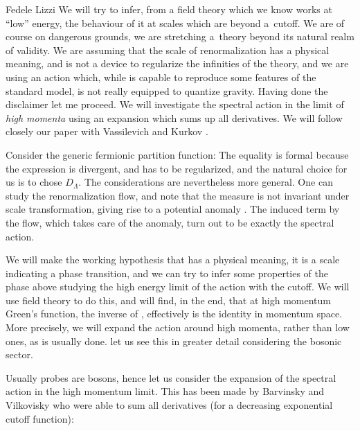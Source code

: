 \begin{artengenv}{Fedele Lizzi}
We will try to infer, from a field theory which we know works at ``low'' energy, the behaviour of it at scales which are beyond a~cutoff. We are of course on dangerous grounds, we are stretching a~theory beyond its natural realm of validity. We are assuming that the scale of renormalization has a physical meaning, and is not a device to regularize the infinities of the theory, and we are using an action which, while is capable to reproduce some features of the standard model, is not really equipped to quantize gravity.
Having done the disclaimer let me proceed. We will investigate the spectral action in the limit of \emph{high momenta} using an expansion which sums up all derivatives. We will follow closely our paper with Vassilevich and Kurkov \parencite*{Kuliva}.

Consider the generic fermionic partition function:
 The equality is formal because the expression is divergent, and has to be regularized, and the natural choice for us is to chose $D_\Lambda$. The considerations are nevertheless more general. One can study the renormalization flow, and note that the measure is not invariant under scale transformation, giving rise to a potential anomaly \parencite{Andrianov:2010nr, Andrianov:2011bc}.
The induced term by the flow, which takes care of the anomaly, turn out to be exactly the spectral action.

We will make the working hypothesis that \formu{\Lambda} has a physical meaning, it is a scale indicating a phase transition, and we can try to infer some properties of the phase above \formu{\Lambda} studying the high energy limit of the action with the cutoff. We will use field theory to do this, and will find, in the end, that at high momentum Green's function, the inverse of , effectively is the identity in momentum space. More precisely, we will expand the action around high momenta, rather than low ones, as is usually done. let us see this in greater detail considering the bosonic sector.



Usually probes are bosons, hence let us consider the expansion of the spectral action in the high momentum limit.
This has been made by Barvinsky and Vilkovisky \parencite*{Barvinsky:1990up} who were able to sum all derivatives (for a decreasing exponential cutoff function):


\end{artengenv}
